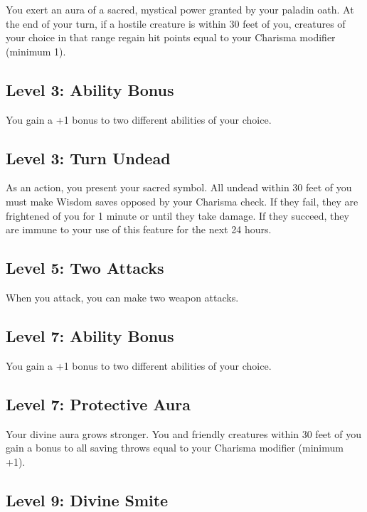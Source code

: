 \documentclass[12pt,letterpaper,twocolumn,openany,nodeprecatedcode,bg=none]{dndbook}
\let\oldsubsection\subsection
\renewcommand{\subsection}[1]{%
  \needspace{5\baselineskip}%
  \oldsubsection{#1}%
}
\begin{document}
You exert an aura of a sacred, mystical power granted by your paladin
oath. At the end of your turn, if a hostile creature is within 30 feet
of you, creatures of your choice in that range regain hit points equal
to your Charisma modifier (minimum 1).

\subsection{Level 3: Ability Bonus}\label{level-3-ability-bonus}

You gain a +1 bonus to two different abilities of your choice.

\subsection{Level 3: Turn Undead}\label{level-3-turn-undead}

As an action, you present your sacred symbol. All undead within 30 feet
of you must make Wisdom saves opposed by your Charisma check. If they
fail, they are frightened of you for 1 minute or until they take damage.
If they succeed, they are immune to your use of this feature for the
next 24 hours.

\subsection{Level 5: Two Attacks}\label{level-5-two-attacks}

When you attack, you can make two weapon attacks.

\subsection{Level 7: Ability Bonus}\label{level-7-ability-bonus}

You gain a +1 bonus to two different abilities of your choice.

\subsection{Level 7: Protective Aura}\label{level-7-protective-aura}

Your divine aura grows stronger. You and friendly creatures within 30
feet of you gain a bonus to all saving throws equal to your Charisma
modifier (minimum +1).

\onecolumn

\subsection{Level 9: Divine Smite}\label{level-9-divine-smite}
\end{document}
